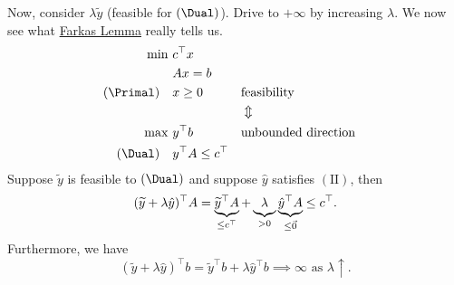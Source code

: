 \begin{remark}
	Now, consider \(\lambda \widetilde{y}\) (feasible for \((\Dual)\)). Drive to \(+\infty \) by increasing \(\lambda\). We now see what \hyperref[lma:Farkas]{Farkas Lemma} really tells us.
	\[
		\begin{aligned}
			\min~          & c^{\top} x                                               \\
			               & Ax = b                                                   \\
			(\Primal)\quad & x\geq 0                  &  & \text{feasibility}         \\
			               &                          &  & \Updownarrow               \\
			\max~          & y^{\top}b                &  & \text{unbounded direction} \\
			(\Dual)\quad   & y^{\top} A \leq c^{\top}                                 \\
		\end{aligned}
	\]
	Suppose \(\widetilde{y}\) is feasible to \((\Dual)\) and suppose \(\hat{y}\) satisfies \((\mathrm{II})\), then
	\[
		(\widetilde{y}+\lambda \hat{y})^{\top} A = \underbrace{\widetilde{y}^{\top}A}_{\leq c^{\top}} + \underbrace{\vphantom{y}\lambda}_{>0} \underbrace{\hat{y}^{\top} A}_{\leq \vec{0}} \leq c^{\top}.
	\]
	Furthermore, we have
	\[
		(\widetilde{y}+\lambda \hat{y})^{\top} b = \widetilde{y}^{\top} b+\lambda \hat{y}^{\top} b \implies \infty \text{ as } \lambda \uparrow  .
	\]
\end{remark}

